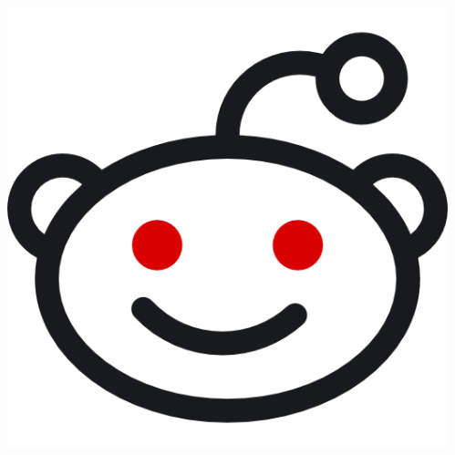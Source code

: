 \documentclass[aspectratio=169]{beamer}
\begin{document}
\begin{frame}
{\begin{columns}[t]
\begin{column}{.15\textwidth}
{                \includegraphics{png/reddit.png}}
            \end{column}
            \begin{column}{.15\textwidth}

\end{column}
\end{columns}}
\end{frame}
\end{document}
